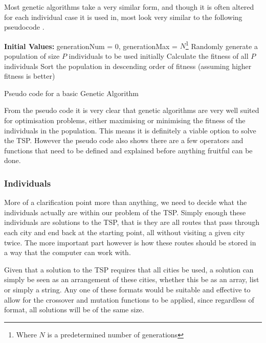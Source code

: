 \documentclass[11pt,a4paper,titlepage]{article}
\begin{document}
Most genetic algorithms take a very similar form, and though it is often altered for each individual case it is used in, most look very similar to the following pseudocode \cite{GAIntro}.

\begin{algorithm}[H]
\SetAlgoLined
\textbf{Initial Values:} generationNum = 0, generationMax = $N$\footnote{Where $N$ is a predetermined number of generations}\;
Randomly generate a population of size $P$ individuals to be used initially\;
Calculate the fitness of all $P$ individuals\;
Sort the population in descending order of fitness (assuming higher fitness is better)\;
\caption{Pseudo code for a basic Genetic Algorithm}
\end{algorithm}

From the pseudo code it is very clear that genetic algorithms are very well suited for optimisation problems, either maximising or minimising the fitness of the individuals in the population. This means it is definitely a viable option to solve the TSP. However the pseudo code also shows there are a few operators and functions that need to be defined and explained before anything fruitful can be done.

\subsubsection{Individuals}

More of a clarification point more than anything, we need to decide what the individuals actually are within our problem of the TSP. Simply enough these individuals are solutions to the TSP, that is they are all routes that pass through each city and end back at the starting point, all without visiting a given city twice. The more important part however is how these routes should be stored in a way that the computer can work with.

Given that a solution to the TSP requires that all cities be used, a solution can simply be seen as an arrangement of these cities, whether this be as an array, list or simply a string. Any one of these formats would be suitable and effective to allow for the crossover and mutation functions to be applied, since regardless of format, all solutions will be of the same size.
\end{document}
